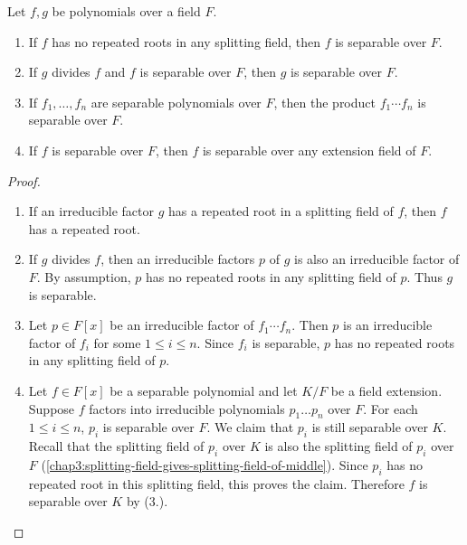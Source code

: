 \begin{lemma}
	Let $f, g$ be polynomials over a field $F$.
	
	\begin{enumerate}
		\item If $f$ has no repeated roots in any splitting field, then $f$ is separable over $F$.
		
		\item If $g$ divides $f$ and $f$ is separable over $F$, then $g$ is separable over $F$.
		
		\item If $f_1, \dotsc, f_n$ are separable polynomials over $F$, then the product $f_1 \dotsb f_n$ is separable over $F$.
		
		\item If $f$ is separable over $F$, then $f$ is separable over any extension field of $F$.
	\end{enumerate}
\end{lemma}
\begin{proof}
	\begin{enumerate}
		\item If an irreducible factor $g$ has a repeated root in a splitting field of $f$, then $f$ has a repeated root.
		
		\item If $g$ divides $f$, then an irreducible factors $p$ of $g$ is also an irreducible factor of $F$. By assumption, $p$ has no repeated roots in any splitting field of $p$. Thus $g$ is separable.
		
		\item Let $p \in F[x]$ be an irreducible factor of $f_1 \dotsb f_n$. Then $p$ is an irreducible factor of $f_i$ for some $1 \leq i \leq n$. Since $f_i$ is separable, $p$ has no repeated roots in any splitting field of $p$.
		
		\item Let $f \in F[x]$ be a separable polynomial and let $K/F$ be a field extension. Suppose $f$ factors into irreducible polynomials $p_1\dotsc p_n$ over $F$. For each $1 \leq i \leq n$, $p_i$ is separable over $F$. We claim that $p_i$ is still separable over $K$. Recall that the splitting field of $p_i$ over $K$ is also the splitting field of $p_i$ over $F$ (\cref{chap3:splitting-field-gives-splitting-field-of-middle}). Since $p_i$ has no repeated root in this splitting field, this proves the claim. Therefore $f$ is separable over $K$ by (3.). \qedhere
	\end{enumerate}	
\end{proof}

